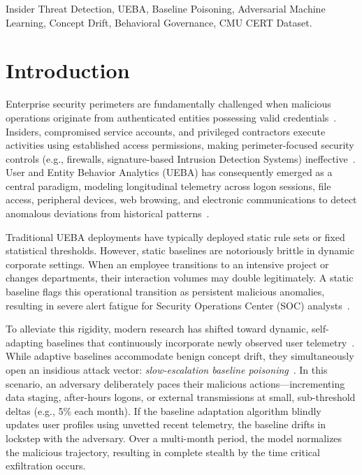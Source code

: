 \documentclass[conference]{IEEEtran}
\begin{document}
\begin{IEEEkeywords}
Insider Threat Detection, UEBA, Baseline Poisoning, Adversarial Machine Learning, Concept Drift, Behavioral Governance, CMU CERT Dataset.
\end{IEEEkeywords}

\section{Introduction}
\label{sec:intro}
Enterprise security perimeters are fundamentally challenged when malicious operations originate from authenticated entities possessing valid credentials~\cite{alzaabi2024review}. Insiders, compromised service accounts, and privileged contractors execute activities using established access permissions, making perimeter-focused security controls (e.g., firewalls, signature-based Intrusion Detection Systems) ineffective~\cite{chinthala2026adversarial}. User and Entity Behavior Analytics (UEBA) has consequently emerged as a central paradigm, modeling longitudinal telemetry across logon sessions, file access, peripheral devices, web browsing, and electronic communications to detect anomalous deviations from historical patterns~\cite{glasser2013cert}.

Traditional UEBA deployments have typically deployed static rule sets or fixed statistical thresholds. However, static baselines are notoriously brittle in dynamic corporate settings. When an employee transitions to an intensive project or changes departments, their interaction volumes may double legitimately. A static baseline flags this operational transition as persistent malicious anomalies, resulting in severe alert fatigue for Security Operations Center (SOC) analysts~\cite{cyberhaven2024anomaly}. 

To alleviate this rigidity, modern research has shifted toward dynamic, self-adapting baselines that continuously incorporate newly observed user telemetry~\cite{song2024britd, bamashmoos2025adaptive, kong2026mambaitd}. While adaptive baselines accommodate benign concept drift, they simultaneously open an insidious attack vector: \textit{slow-escalation baseline poisoning}~\cite{kloft2012security, biggio2018wild}. In this scenario, an adversary deliberately paces their malicious actions---incrementing data staging, after-hours logons, or external transmissions at small, sub-threshold deltas (e.g., 5\% each month). If the baseline adaptation algorithm blindly updates user profiles using unvetted recent telemetry, the baseline drifts in lockstep with the adversary. Over a multi-month period, the model normalizes the malicious trajectory, resulting in complete stealth by the time critical exfiltration occurs.
\end{document}
